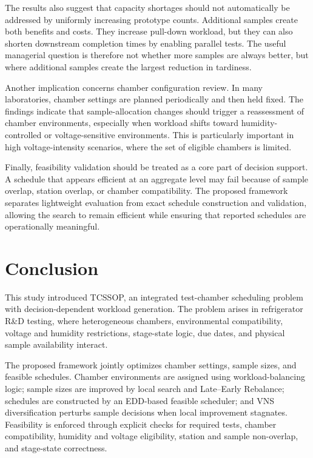 \documentclass[11pt]{article}
\begin{document}
The results also suggest that capacity shortages should not automatically be addressed by uniformly increasing prototype counts. Additional samples create both benefits and costs. They increase pull-down workload, but they can also shorten downstream completion times by enabling parallel tests. The useful managerial question is therefore not whether more samples are always better, but where additional samples create the largest reduction in tardiness.

Another implication concerns chamber configuration review. In many laboratories, chamber settings are planned periodically and then held fixed. The findings indicate that sample-allocation changes should trigger a reassessment of chamber environments, especially when workload shifts toward humidity-controlled or voltage-sensitive environments. This is particularly important in high voltage-intensity scenarios, where the set of eligible chambers is limited.

Finally, feasibility validation should be treated as a core part of decision support. A schedule that appears efficient at an aggregate level may fail because of sample overlap, station overlap, or chamber compatibility. The proposed framework separates lightweight evaluation from exact schedule construction and validation, allowing the search to remain efficient while ensuring that reported schedules are operationally meaningful.

\section{Conclusion}
\label{sec:conc}

This study introduced TCSSOP, an integrated test-chamber scheduling problem with decision-dependent workload generation. The problem arises in refrigerator R\&D testing, where heterogeneous chambers, environmental compatibility, voltage and humidity restrictions, stage-state logic, due dates, and physical sample availability interact.

The proposed framework jointly optimizes chamber settings, sample sizes, and feasible schedules. Chamber environments are assigned using workload-balancing logic; sample sizes are improved by local search and Late--Early Rebalance; schedules are constructed by an EDD-based feasible scheduler; and VNS diversification perturbs sample decisions when local improvement stagnates. Feasibility is enforced through explicit checks for required tests, chamber compatibility, humidity and voltage eligibility, station and sample non-overlap, and stage-state correctness.
\end{document}
